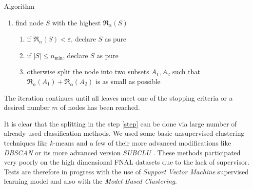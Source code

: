 Algorithm
\begin{enumerate}
\item find node $S$ with the highest $\mathfrak{R}_\alpha(S)$
\begin{enumerate}
\item if $\mathfrak{R}_\alpha(S) < \varepsilon$, declare $S$ as pure
\item if $|S| \leq n_\mathrm{min}$, declare $S$ as pure
\item otherwise split the node into two subsets $A_1, A_2 $ such that $\mathfrak{R}_\alpha(A_1) + \mathfrak{R}_\alpha(A_2)$ is as small as possible \label{step}
\end{enumerate}
\end{enumerate}

\noindent The iteration continues until all leaves meet one of the stopping criteria or a desired number $m$ of nodes has been reached. 

It is clear that the splitting in the step \ref{step} can be done via large number of already used classification methods. We used some basic unsupervised clustering techniques like $k$-means and a few of their more advanced modifications like  \emph{DBSCAN} \cite{Ester} or its more advanced version \emph{SUBCLU} \cite{Kailing}. These methods  participated very poorly on the high dimensional FNAL datasets due to the lack of supervisor. Tests are therefore in progress with the use of \emph{Support Vector Machine} supervised learning model and also with the \emph{Model Based Clustering}. 







